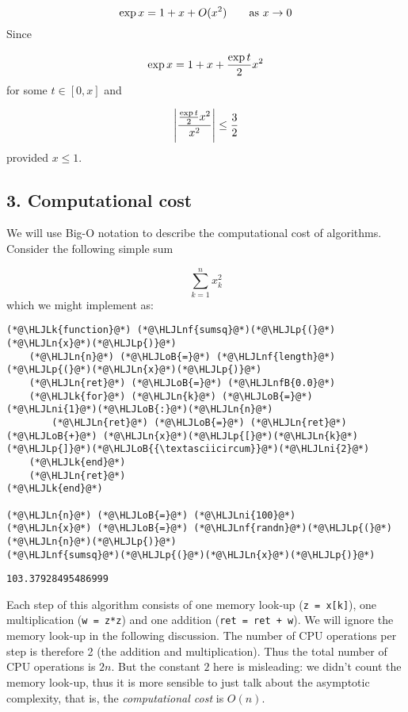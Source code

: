 \documentclass[12pt,a4paper]{article}
\newcommand{\HLJLk}[1]{\textcolor[RGB]{148,91,176}{\textbf{#1}}}
\newcommand{\HLJLn}[1]{#1}
\newcommand{\HLJLnf}[1]{\textcolor[RGB]{66,102,213}{#1}}
\newcommand{\HLJLnfB}[1]{\textcolor[RGB]{59,151,46}{#1}}
\newcommand{\HLJLni}[1]{\textcolor[RGB]{59,151,46}{#1}}
\newcommand{\HLJLoB}[1]{\textcolor[RGB]{102,102,102}{\textbf{#1}}}
\newcommand{\HLJLp}[1]{#1}
\begin{document}
\[
\exp x = 1 + x + O(x^2) \qquad \hbox{as $x \ensuremath{\rightarrow} 0$}
\]
Since

\[
\exp x = 1 + x + {\exp t \over 2} x^2
\]
for some $t \in [0,x]$ and

\[
\left|{{\exp t \over 2} x^2 \over x^2}\right| \leq {3 \over 2}
\]
provided $x \leq 1$.

\subsection{3. Computational cost}
We will use Big-O notation to describe the computational cost of algorithms. Consider the following simple sum

\[
\sum_{k=1}^n x_k^2
\]
which we might implement as:


\begin{lstlisting}
(*@\HLJLk{function}@*) (*@\HLJLnf{sumsq}@*)(*@\HLJLp{(}@*)(*@\HLJLn{x}@*)(*@\HLJLp{)}@*)
    (*@\HLJLn{n}@*) (*@\HLJLoB{=}@*) (*@\HLJLnf{length}@*)(*@\HLJLp{(}@*)(*@\HLJLn{x}@*)(*@\HLJLp{)}@*)
    (*@\HLJLn{ret}@*) (*@\HLJLoB{=}@*) (*@\HLJLnfB{0.0}@*)
    (*@\HLJLk{for}@*) (*@\HLJLn{k}@*) (*@\HLJLoB{=}@*) (*@\HLJLni{1}@*)(*@\HLJLoB{:}@*)(*@\HLJLn{n}@*)
        (*@\HLJLn{ret}@*) (*@\HLJLoB{=}@*) (*@\HLJLn{ret}@*) (*@\HLJLoB{+}@*) (*@\HLJLn{x}@*)(*@\HLJLp{[}@*)(*@\HLJLn{k}@*)(*@\HLJLp{]}@*)(*@\HLJLoB{{\textasciicircum}}@*)(*@\HLJLni{2}@*)
    (*@\HLJLk{end}@*)
    (*@\HLJLn{ret}@*)
(*@\HLJLk{end}@*)

(*@\HLJLn{n}@*) (*@\HLJLoB{=}@*) (*@\HLJLni{100}@*)
(*@\HLJLn{x}@*) (*@\HLJLoB{=}@*) (*@\HLJLnf{randn}@*)(*@\HLJLp{(}@*)(*@\HLJLn{n}@*)(*@\HLJLp{)}@*)
(*@\HLJLnf{sumsq}@*)(*@\HLJLp{(}@*)(*@\HLJLn{x}@*)(*@\HLJLp{)}@*)
\end{lstlisting}

\begin{lstlisting}
103.37928495486999
\end{lstlisting}


Each step of this algorithm consists of one memory look-up (\texttt{z = x[k]}), one multiplication (\texttt{w = z*z}) and one addition (\texttt{ret = ret + w}). We will ignore the memory look-up in the following discussion. The number of CPU operations per step is therefore 2 (the addition and multiplication). Thus the total number of CPU operations is $2n$. But the constant $2$ here is misleading: we didn't count the memory look-up, thus it is more sensible to just talk about the asymptotic complexity, that is, the \emph{computational cost} is $O(n)$.
\end{document}
